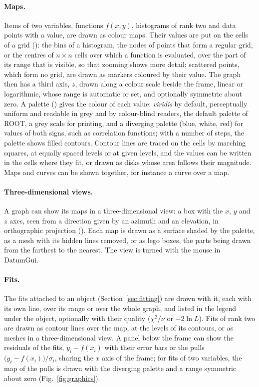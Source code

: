 \paragraph{Maps.}
Items of two variables, functions $f(x,y)$, histograms of rank two and data points with a value, are drawn as colour
maps. Their values are put on the cells of a grid (): the bins of a histogram, the nodes of points that
form a regular grid, or the centres of $n \times n$ cells over which a function is evaluated, over the part of its
range that is visible, so that zooming shows more detail; scattered points, which form no grid, are drawn as markers
coloured by their value. The graph then has a third axis, $z$, drawn along a colour scale beside the frame, linear or
logarithmic, whose range is automatic or set, and optionally symmetric about zero. A palette () gives
the colour of each value: \emph{viridis} by default, perceptually uniform and readable in grey and by colour-blind
readers, the default palette of ROOT, a grey scale for printing, and a diverging palette (blue, white, red) for
values of both signs, such as correlation functions; with a number of steps, the palette shows filled contours.
Contour lines are traced on the cells by marching squares, at equally spaced levels or at given levels, and the values
can be written in the cells where they fit, or drawn as disks whose area follows their magnitude. Maps and curves can
be shown together, for instance a curve over a map.

\paragraph{Three-dimensional views.}
A graph can show its maps in a three-dimensional view: a box with the $x$, $y$ and $z$ axes, seen from a direction
given by an azimuth and an elevation, in orthographic projection (). Each map is drawn as a surface
shaded by the palette, as a mesh with its hidden lines removed, or as lego boxes, the parts being drawn from the
farthest to the nearest. The view is turned with the mouse in DatumGui.

\paragraph{Fits.}
The fits attached to an object (Section~\ref{sec:fitting}) are drawn with it, each with its own line, over its range
or over the whole graph, and listed in the legend under the object, optionally with their quality
($\chi^2/\nu$ or $-2\ln L$). Fits of rank two are drawn as contour lines over the map, at the levels of its
contours, or as meshes in a three-dimensional view. A panel below the frame can show the residuals of the fits,
$y_i - f(x_i)$ with their error bars or the pulls $\bigl(y_i - f(x_i)\bigr)/\sigma_i$, sharing the $x$ axis of the
frame; for fits of two variables, the map of the pulls is drawn with the diverging palette and a range symmetric
about zero (Fig.~\ref{fig:graphics}).


